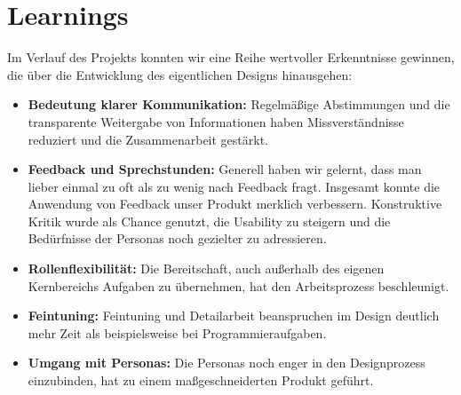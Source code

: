 \section{Learnings}
Im Verlauf des Projekts konnten wir eine Reihe wertvoller Erkenntnisse gewinnen, die über die Entwicklung des eigentlichen Designs hinausgehen:

\begin{itemize}
	\item \textbf{Bedeutung klarer Kommunikation:} Regelmäßige Abstimmungen und die transparente Weitergabe von Informationen haben Missverständnisse reduziert und die Zusammenarbeit gestärkt.
	\item \textbf{Feedback und Sprechstunden:} Generell haben wir gelernt, dass man lieber einmal zu oft als zu wenig nach Feedback fragt. Insgesamt konnte die Anwendung von Feedback unser Produkt merklich verbessern. Konstruktive Kritik wurde als Chance genutzt, die Usability zu steigern und die Bedürfnisse der Personas noch gezielter zu adressieren.
	\item \textbf{Rollenflexibilität:} Die Bereitschaft, auch außerhalb des eigenen Kernbereichs Aufgaben zu übernehmen, hat den Arbeitsprozess beschleunigt.
	\item \textbf{Feintuning:} Feintuning und Detailarbeit beanspruchen im Design deutlich mehr Zeit als beispielsweise bei Programmieraufgaben.
	\item \textbf{Umgang mit Personas:} Die Personas noch enger in den Designprozess einzubinden, hat zu einem maßgeschneiderten Produkt geführt.
\end{itemize}

\newpage

